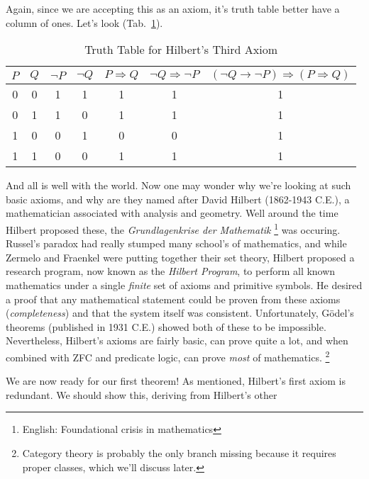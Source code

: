     Again, since we are accepting this as an axiom, it's truth table better have
    a column of ones. Let's look
    (Tab.~\ref{tab:Truth_Table_Hiberts_Third_Axiom}).
    \begin{table}[H]
        \centering
        \captionsetup{type=table}
        \begin{tabular}{c|c|c|c|c|c|c}
            $P$&$Q$&$\neg{P}$&$\neg{Q}$&$P\Rightarrow{Q}$&
                $\neg{Q}\Rightarrow\neg{P}$&
                $(\neg{Q}\rightarrow\neg{P})\Rightarrow(P\Rightarrow{Q})$\\
            \hline
            0&0&1&1&1&1&1\\
            0&1&1&0&1&1&1\\
            1&0&0&1&0&0&1\\
            1&1&0&0&1&1&1
        \end{tabular}
        \caption{Truth Table for Hilbert's Third Axiom}
        \label{tab:Truth_Table_Hiberts_Third_Axiom}
    \end{table}
    And all is well with the world. Now one may wonder why we're looking at such
    basic axioms, and why are they named after David Hilbert (1862-1943 C.E.),
    a mathematician associated with analysis and geometry. Well around the
    time Hilbert proposed these, the \textit{Grundlagenkrise der Mathematik}%
    \footnote{English: Foundational crisis in mathematics}
    was occuring. Russel's paradox had really stumped many school's of
    mathematics, and while Zermelo and Fraenkel were putting together their
    set theory, Hilbert proposed a research program, now known as the
    \textit{Hilbert Program}, to perform all known
    mathematics under a single \textit{finite} set of axioms and primitive
    symbols. He desired a proof that any mathematical statement could be proven
    from these axioms (\textit{completeness}) and that the system itself was
    consistent. Unfortunately, G\"{o}del's theorems (published in 1931 C.E.)
    showed both of these to be impossible. Nevertheless, Hilbert's axioms are
    fairly basic, can prove quite a lot, and when combined with \gls{ZFC} and
    predicate logic, can prove \textit{most} of mathematics.%
    \footnote{%
        Category theory is probably the only branch missing because it requires
        proper classes, which we'll discuss later.
    }
    \par\hfill\par
    We are now ready for our first theorem! As mentioned, Hilbert's first
    axiom is redundant. We should show this, deriving from Hilbert's other
